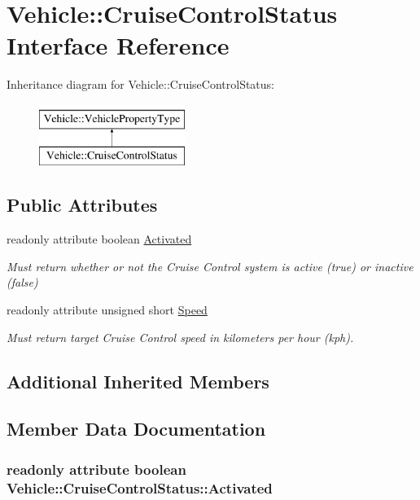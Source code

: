 \hypertarget{interfaceVehicle_1_1CruiseControlStatus}{\section{Vehicle\-:\-:Cruise\-Control\-Status Interface Reference}
\label{interfaceVehicle_1_1CruiseControlStatus}
}
Inheritance diagram for Vehicle\-:\-:Cruise\-Control\-Status\-:\begin{figure}[H]
\begin{center}
\leavevmode
\includegraphics[height=2.000000cm]{interfaceVehicle_1_1CruiseControlStatus}
\end{center}
\end{figure}
\subsection*{Public Attributes}
\begin{DoxyCompactItemize}
\item 
readonly attribute boolean \hyperlink{interfaceVehicle_1_1CruiseControlStatus_a8cf1ac245717dc37899b0d71ba861e1e}{Activated}
\begin{DoxyCompactList}\small\item\em Must return whether or not the Cruise Control system is active (true) or inactive (false) \end{DoxyCompactList}\item 
readonly attribute unsigned short \hyperlink{interfaceVehicle_1_1CruiseControlStatus_aa504d0647f131ca980e8d53431cbb5c6}{Speed}
\begin{DoxyCompactList}\small\item\em Must return target Cruise Control speed in kilometers per hour (kph). \end{DoxyCompactList}\end{DoxyCompactItemize}
\subsection*{Additional Inherited Members}


\subsection{Member Data Documentation}
\hypertarget{interfaceVehicle_1_1CruiseControlStatus_a8cf1ac245717dc37899b0d71ba861e1e}{
\subsubsection[{Activated}]{\setlength{\rightskip}{0pt plus 5cm}readonly attribute boolean Vehicle\-::\-Cruise\-Control\-Status\-::\-Activated}}\label{interfaceVehicle_1_1CruiseControlStatus_a8cf1ac245717dc37899b0d71ba861e1e}


